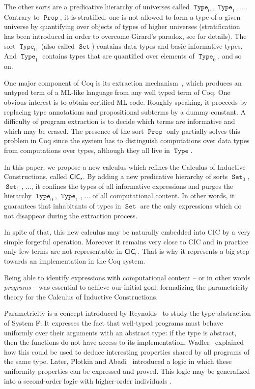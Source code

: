 \documentclass[a4paper,USenglish]{lipics}
\DeclareMathOperator{\Prop}{\mathtt{Prop}}
\DeclareMathOperator{\Type}{\mathtt{Type}}
\DeclareMathOperator{\Set}{\mathtt{Set}}
\def\coq{\textsf{Coq}\xspace}
\def\ml{\textsf{ML}\xspace}
\def\cic{\textsf{CIC}\xspace}
\def\cicr{$\text{\textsf{CIC}}_{\text{\textsf{r}}}$\xspace}
\newcommand{\ML}{{\ml}}
\begin{document}
The other sorts are a predicative hierarchy of universes called
$\Type_0, \Type_1, \dots$. Contrary to $\Prop$, it is stratified: one is
not allowed to form a type of a given universe by quantifying over
objects of types of higher universes (stratification has been
introduced in order to overcome Girard's paradox, see
\cite{DBLP:conf/lics/Coquand86} for details). The sort $\Type_0$
(also called $\Set$) contains data-types and basic informative
types. And $\Type_1$ contains types that are quantified over elements of
$\Type_0$, and so on.

One major component of \coq is its extraction
mechanism~\cite{DBLP:conf/types/Letouzey02}, which produces an untyped
term of a \ML-like language from any well typed term of \coq. One
obvious interest is to obtain certified ML code. Roughly speaking, it
proceeds by replacing type annotations and propositional subterms by a
dummy constant. A
difficulty of program extraction is to decide
which terms are informative and which may be erased.
The presence of the sort $\Prop$
only partially solves this problem in \coq since the system has to
distinguish computations over data types from computations over types,
although they all live in $\Type$.

In this paper, we propose a new calculus  which refines the Calculus of
Inductive Constructions, called \cicr. By adding a new predicative hierarchy of sorts
$\Set_0$, $\Set_1$, ..., it confines the types of all informative expressions
and purges the hierarchy $\Type_0$, $\Type_1$, ... of all computational
content. In other words, it guarantees that inhabitants of types in $\Set$
are the only expressions which do not disappear during the extraction
process.

In spite of that, this new calculus may be naturally embedded into
\cic by a very simple forgetful operation. Moreover it remains very
close to \cic and in practice only few terms are not representable
in \cicr. That is why it represents a big step towards an
implementation in the \coq system.

Being able to identify expressions with computational content
-- or in other words \emph{programs} -- was essential to achieve our
initial goal: formalizing the parametricity theory for the Calculus of
Inductive Constructions.

Parametricity is a concept introduced by
Reynolds~\cite{DBLP:conf/ifip/Reynolds83} to study the type abstraction of
System F. It expresses the fact that well-typed programs must behave
uniformly over their arguments with an abstract type: if the type is
abstract, then the functions do not have access to its implementation.
Wadler~\cite{Wadler89} explained how this could be used to
deduce interesting properties shared by all programs of the same type.
Later, Plotkin and Abadi~\cite{DBLP:conf/tlca/PlotkinA93} introduced a logic in which these uniformity
properties can be expressed and proved. This logic may be generalized into
a second-order logic with higher-order individuals
\cite{DBLP:journals/fuin/Takeuti98, DBLP:journals/tcs/Wadler07}.
\end{document}
